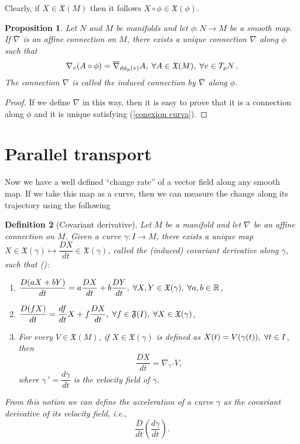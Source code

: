 \documentclass[11pt]{book}
\newtheorem{defi}{Definition}[chapter]
\newtheorem{pro}[defi]{Proposition}
\def\R{\mathbb R}
\def\F{\mathfrak F}
\def\x{\mathfrak X}
\begin{document}
Clearly, if $X\in \x(M)$ then it follows $X\circ \phi\in \x(\phi)$.

\begin{pro}
	Let $N$ and $M$ be manifolds and let $\phi:N\to M$ be a smooth map. If $\overline{\nabla}$ is an affine connection on $M$, there exists a unique connection $\nabla$ along $\phi$ such that
	\begin{equation}\label{conexion curva}
		\nabla_v(A\circ \phi)=\overline{\nabla}_{d\phi_p(v)}A,\hspace{1mm} \forall A\in \x(M),\hspace{1mm} \forall v\in T_pN\,.
	\end{equation}
	The connection $\nabla$ is called the induced connection by $\overline{\nabla}$ along $\phi$. 
\end{pro}
\begin{proof}
	If we define $\nabla$ in this way, then it is easy to prove that it is a connection along $\phi$ and it is unique satisfying (\ref{conexion curva}).
\end{proof}

\section{Parallel transport}
Now we have a well defined ``change rate'' of a vector field along any smooth map. If we take this map as a curve, then we can measure the change along its trajectory using the following 
\begin{defi}[Covariant derivative]\label{derivada covariante}
	Let $M$ be a manifold and let $\nabla$ be an affine connection on $M$. Given a curve $\gamma:I\to M$, there exists a unique map  $X\in \x(\gamma) \mapsto \dfrac{DX}{dt}\in \x(\gamma)$, called the (induced) covariant derivative along $\gamma$, such that (\cite{SRG}):
	\begin{enumerate}
		\item $\dfrac{D(aX+bY)}{dt}=a \dfrac{DX}{dt}+ b \dfrac{DY}{dt},\hspace{1mm} \forall X,Y\in \x(\gamma),\hspace{1mm} \forall a,b\in \R$,
		\item $\dfrac{D(fX)}{dt}=\dfrac{df}{dt} X + f \dfrac{DX}{dt},\hspace{1mm} \forall f\in \F(I), \hspace{1mm} \forall X\in\x(\gamma) $,
		\item For every $V\in \x(M)$, if $X\in \x(\gamma)$ is defined as $X(t)=V(\gamma(t)), \hspace{1mm} \forall t\in I$, then
		\[
		\frac{DX}{dt}=\nabla_{\gamma{\,'}} V,
		\]
		where $\gamma{\,'}=\dfrac{d\gamma}{dt}$ is the velocity field of $\gamma$.
	\end{enumerate}
	
	From this notion we can define the acceleration of a curve $\gamma$ as the covariant derivative of its velocity field, i.e., $$\frac{D}{dt}\left(\frac{d\gamma}{dt}\right).$$
\end{defi}
\end{document}
